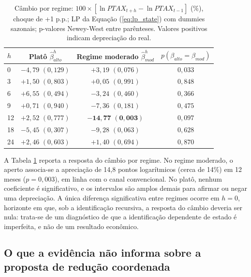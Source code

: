 \documentclass[12pt,a4paper]{article}
\begin{document}
\begin{table}[htbp]
\centering
\small
\caption{Câmbio por regime: $100 \times [\ln PTAX_{t+h} - \ln PTAX_{t-1}]$ (\%), choque de +1 p.p.; LP da Equação (\ref{eq:lp_state}) com dummies sazonais; p-valores Newey-West entre parênteses. Valores positivos indicam depreciação do real.}
\label{tab:ptax_regime}
\begin{tabular}{lccc}
\toprule
$h$ & \textbf{Platô} $\hat{\beta}_{alto}^h$ & \textbf{Regime moderado} $\hat{\beta}_{mod}^h$ & $p(\beta_{alto}=\beta_{mod})$ \\
\midrule
0 & $-4{,}79$ $(0{,}129)$ & $+3{,}19$ $(0{,}076)$ & $0{,}033$ \\
3 & $+1{,}50$ $(0{,}803)$ & $+0{,}05$ $(0{,}991)$ & $0{,}848$ \\
6 & $+6{,}55$ $(0{,}494)$ & $-3{,}24$ $(0{,}460)$ & $0{,}366$ \\
9 & $+0{,}71$ $(0{,}940)$ & $-7{,}36$ $(0{,}181)$ & $0{,}475$ \\
12 & $+2{,}52$ $(0{,}777)$ & $\mathbf{-14{,}77}$ $\mathbf{(0{,}003)}$ & $0{,}097$ \\
18 & $-5{,}45$ $(0{,}307)$ & $-9{,}28$ $(0{,}063)$ & $0{,}628$ \\
24 & $+2{,}46$ $(0{,}603)$ & $+1{,}40$ $(0{,}694)$ & $0{,}870$ \\
\bottomrule
\end{tabular}
\end{table}

A Tabela \ref{tab:ptax_regime} reporta a resposta do câmbio por regime. No regime moderado, o aperto associa-se a apreciação de 14,8 pontos logarítmicos (cerca de 14\%) em 12 meses ($p = 0{,}003$), em linha com o canal convencional. No platô, nenhum coeficiente é significativo, e os intervalos são amplos demais para afirmar ou negar uma depreciação. A única diferença significativa entre regimes ocorre em $h = 0$, horizonte em que, sob a identificação recursiva, a resposta do câmbio deveria ser nula: trata-se de um diagnóstico de que a identificação dependente de estado é imperfeita, e não de um resultado econômico.

\subsection{O que a evidência não informa sobre a proposta de redução coordenada}
\end{document}
